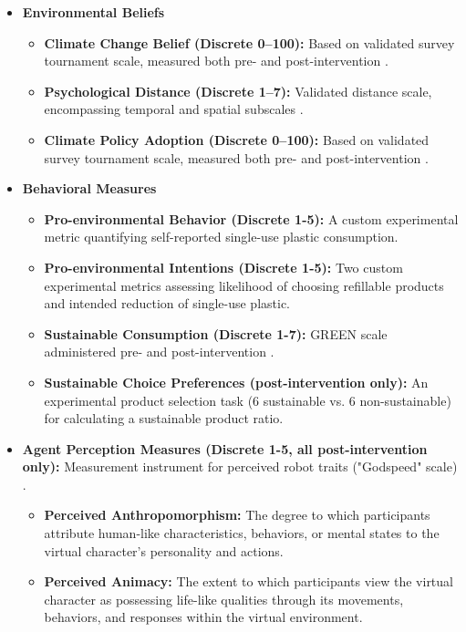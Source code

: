\documentclass[sigconf, nonacm]{acmart}
\begin{document}
\begin{itemize}
    \item \textbf{Environmental Beliefs}
    \begin{itemize}
        \item \textbf{Climate Change Belief (Discrete 0--100):} Based on validated survey tournament scale, measured both pre- and post-intervention \cite{Vlasceanu2024}.
        \item \textbf{Psychological Distance (Discrete 1--7):} Validated distance scale, encompassing temporal and spatial subscales \cite{vanV2021}.
        \item \textbf{Climate Policy Adoption (Discrete 0--100):} Based on validated survey tournament scale, measured both pre- and post-intervention \cite{Vlasceanu2024}.
    \end{itemize}

    \item \textbf{Behavioral Measures}
    \begin{itemize}
        \item \textbf{Pro-environmental Behavior (Discrete 1-5):} A custom experimental metric quantifying self-reported single-use plastic consumption.
        \item \textbf{Pro-environmental Intentions (Discrete 1-5):} Two custom experimental metrics assessing likelihood of choosing refillable products and intended reduction of single-use plastic.
        \item \textbf{Sustainable Consumption (Discrete 1-7):} GREEN scale administered pre- and post-intervention \cite{Haws2014}.
        \item \textbf{Sustainable Choice Preferences (post-intervention only):} An experimental product selection task (6 sustainable vs. 6 non-sustainable) for calculating a sustainable product ratio.
    \end{itemize}

    \item \textbf{Agent Perception Measures (Discrete 1-5, all post-in\-ter\-vention only):} Measurement instrument for perceived robot traits ("Godspeed" scale) \cite{Bartneck2009}.
    \begin{itemize}
    \item \textbf{Perceived Anthropomorphism:} The degree to which participants attribute human-like characteristics, behaviors, or mental states to the virtual character's personality and actions.
    
    \item \textbf{Perceived Animacy:} The extent to which participants view the virtual character as possessing life-like qualities through its movements, behaviors, and responses within the virtual environment.
    

\end{itemize}
\end{itemize}
\end{document}
